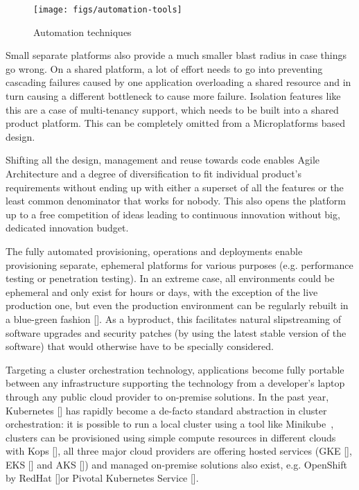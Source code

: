\documentclass[reprint,amsmath,amssymb,aps]{revtex4-1}
\begin{document}
\begin{figure}[h]
	\texttt{[image: figs/automation-tools]}
	\caption{Automation techniques}
	\label{fig:automation-techniques}
\end{figure}

Small separate platforms also provide a much smaller blast radius in case things go wrong. On a shared platform, a lot of effort needs to go into preventing cascading failures caused by one application overloading a shared resource and in turn causing a different bottleneck to cause more failure. Isolation features like this are a case of multi-tenancy support, which needs to be built into a shared product platform. This can be completely omitted from a Microplatforms based design.

Shifting all the design, management and reuse towards code enables Agile Architecture and a degree of diversification to fit individual product's requirements without ending up with either a superset of all the features or the least common denominator that works for nobody. This also opens the platform up to a free competition of ideas leading to continuous innovation without big, dedicated innovation budget.

The fully automated provisioning, operations and deployments enable provisioning separate, ephemeral platforms for various purposes (e.g. performance testing or penetration testing). In an extreme case, all environments could be ephemeral and only exist for hours or days, with the exception of the live production one, but even the production environment can be regularly rebuilt in a blue-green fashion []. As a byproduct, this facilitates natural slipstreaming of software upgrades and security patches (by using the latest stable version of the software) that would otherwise have to be specially considered.

Targeting a cluster orchestration technology, applications become fully portable between any infrastructure supporting the technology from a developer's laptop through any public cloud provider to on-premise solutions. In the past year, Kubernetes [] has rapidly become a de-facto standard abstraction in cluster orchestration: it is possible to run a local cluster using a tool like Minikube~\cite{RunningK70:online}, clusters can be provisioned using simple compute resources in different clouds with Kops [], all three major cloud providers are offering hosted services (GKE [], EKS [] and AKS []) and managed on-premise solutions also exist, e.g. OpenShift by RedHat []or Pivotal Kubernetes Service [].
\end{document}
